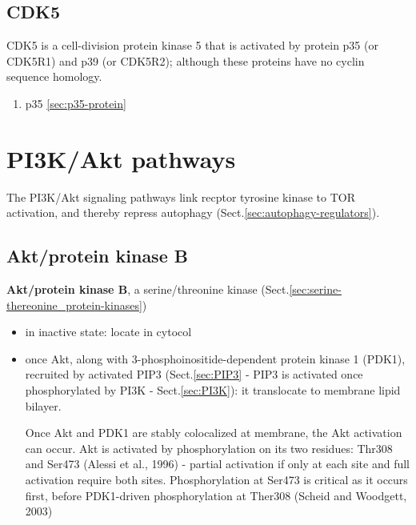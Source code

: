\subsection{CDK5}
\label{sec:CDK5}

CDK5 is a cell-division protein kinase 5 that is activated by protein p35 (or
CDK5R1) and p39 (or CDK5R2); although these proteins have no cyclin sequence
homology.

\begin{enumerate}
  \item p35 \ref{sec:p35-protein}
\end{enumerate}



\section{PI3K/Akt pathways}
\label{sec:PI3K-Akt-pathways}

The PI3K/Akt signaling pathways link recptor tyrosine kinase to TOR activation,
and thereby repress autophagy (Sect.\ref{sec:autophagy-regulators}).

\subsection{Akt/protein kinase B}
\label{sec:Akt-protein-kianse-B}

{\bf Akt/protein kinase B}, a serine/threonine kinase (Sect.\ref{sec:serine-thereonine_protein-kinases})

\begin{itemize}
  \item in inactive state: locate in cytocol
  
  \item once Akt, along with 3-phosphoinositide-dependent protein kinase 1
  (PDK1), recruited by activated PIP3 (Sect.\ref{sec:PIP3} - PIP3 is activated
  once phosphorylated by PI3K - Sect.\ref{sec:PI3K}):   it translocate to
  membrane lipid bilayer.
  
  Once Akt and PDK1 are stably colocalized at membrane, the Akt activation can
  occur.    Akt is activated by phosphorylation on its two residues: Thr308 and
  Ser473 (Alessi et al., 1996) - partial activation if only at each site and full
  activation require both sites. 
  Phosphorylation at Ser473 is critical as it occurs first, before PDK1-driven
  phosphorylation at Ther308 (Scheid and Woodgett, 2003)
  
\end{itemize}

